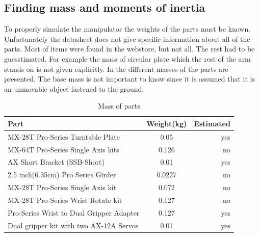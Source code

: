 \subsection{Finding mass and moments of inertia}\label{sec:massInert}
To properly simulate the manipulator the weights of the parts must be known. Unfortunately the datasheet does not give specific information about all of the parts. Most of items were found in the webstore, but not all. The rest had to be guesstimated. For example the mass of circular plate which the rest of the arm stands on is not given explicitly. In  the different masses of the parts are presented. The base mass is not important to know since it is assumed that it is an unmovable object fastened to the ground. 
\begin{table}[htbp]
\centering
\caption{Mass of parts}
\label{table:partmass}
    \begin{tabular}{l c r}
        \toprule
        Part  &  Weight(kg) & Estimated\\
        \midrule
        MX-28T Pro-Series Turntable Plate& 0.05 & yes\\
        MX-64T Pro-Series Single Axis kits& 0.126 & no\\
        AX Short Bracket (SSB-Short) & 0.01 & yes\\
        2.5 inch(6.35cm) Pro Series Girder & 0.0227 & no\\
        MX-28T Pro-Series Single Axis kit & 0.072 & no \\
        MX-28T Pro-Series Wrist Rotate kit & 0.127 & no\\
        Pro-Series Wrist to Dual Gripper Adapter & 0.127 & yes\\
        Dual gripper kit with two AX-12A Servos& 0.01 & yes\\
        \bottomrule
    \end{tabular}
\end{table}

